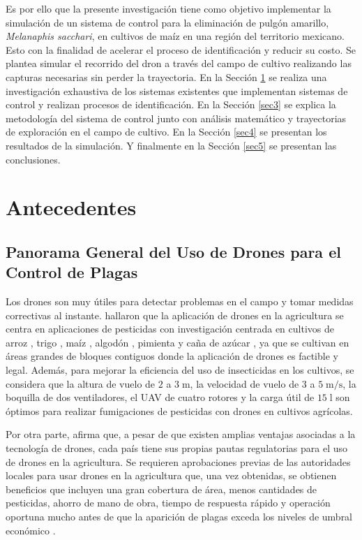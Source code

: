 \documentclass[11pt]{exam}
\begin{document}
    Es por ello que la presente investigaci\'on tiene como objetivo implementar la simulaci\'on de un sistema de control para la eliminaci\'on de pulg\'on amarillo, \textit{Melanaphis sacchari}, en cultivos de ma\'iz en una regi\'on del territorio mexicano. Esto con la finalidad de acelerar el proceso de identificaci\'on y reducir su costo. Se plantea simular el recorrido del dron a trav\'es del campo de cultivo realizando las capturas necesarias sin perder la trayectoria. En la Secci\'on \ref{sec2} se realiza una investigaci\'on exhaustiva de los sistemas existentes que implementan sistemas de control y realizan procesos de identificaci\'on. En la Secci\'on \ref{sec3} se explica la metodología del sistema de control junto con análisis matemático y trayectorias de exploración en el campo de cultivo. En la Secci\'on \ref{sec4} se presentan los resultados de la simulaci\'on. Y finalmente en la Secci\'on \ref{sec5} se presentan las conclusiones.

    \section{Antecedentes}\label{sec2}
        \subsection{Panorama General del Uso de Drones para el Control de Plagas}\label{sec2.1}
        Los drones son muy \'utiles para detectar problemas en el campo y tomar medidas correctivas al instante. \textcite{subramanian-2021} hallaron que la aplicaci\'on de drones en la agricultura se centra en aplicaciones de pesticidas con investigaci\'on centrada en cultivos de arroz \autocite{quin-2016}, trigo \autocite{wang-2019}, ma\'iz \autocite{zheng-2017}, algod\'on \autocite{lou-2018}, pimienta \autocite{xiao-2020} y caña de az\'ucar \autocite{zhang-2019}, ya que se cultivan en \'areas grandes de bloques contiguos donde la aplicaci\'on de drones es factible y legal. Además, para mejorar la eficiencia del uso de insecticidas en los cultivos, se considera que la altura de vuelo de $2$ a $3\;\mathrm{m}$, la velocidad de vuelo de $3$ a $5\;\mathrm{m/s}$, la boquilla de dos ventiladores, el UAV de cuatro rotores y la carga útil de $15\;\mathrm{l}$ son óptimos para realizar fumigaciones de pesticidas con drones en cultivos agrícolas.

        Por otra parte, \textcite{ayamga-2021} afirma que, a pesar de que existen amplias ventajas asociadas a la tecnología de drones, cada país tiene sus propias pautas regulatorias para el uso de drones en la agricultura. Se requieren aprobaciones previas de las autoridades locales para usar drones en la agricultura que, una vez obtenidas, se obtienen beneficios que incluyen una gran cobertura de área, menos cantidades de pesticidas, ahorro de mano de obra, tiempo de respuesta rápido y operación oportuna mucho antes de que la aparición de plagas exceda los niveles de umbral económico \autocite{huang-2018}.
\end{document}
